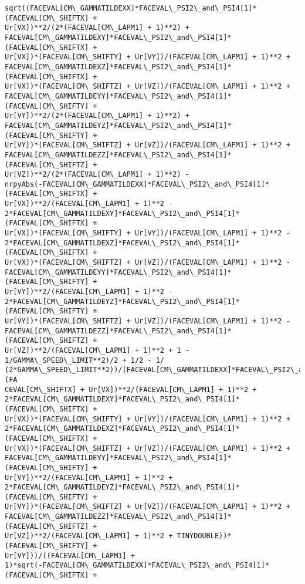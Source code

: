 \documentclass[landscape,letterpaper,10pt,english]{article}
\begin{document}
\begin{Verbatim}[commandchars=\\\{\}]
sqrt((FACEVAL[CM\_GAMMATILDEXX]*FACEVAL\_PSI2\_and\_PSI4[1]*(FACEVAL[CM\_SHIFTX] +
Ur[VX])**2/(2*(FACEVAL[CM\_LAPM1] + 1)**2) +
FACEVAL[CM\_GAMMATILDEXY]*FACEVAL\_PSI2\_and\_PSI4[1]*(FACEVAL[CM\_SHIFTX] +
Ur[VX])*(FACEVAL[CM\_SHIFTY] + Ur[VY])/(FACEVAL[CM\_LAPM1] + 1)**2 +
FACEVAL[CM\_GAMMATILDEXZ]*FACEVAL\_PSI2\_and\_PSI4[1]*(FACEVAL[CM\_SHIFTX] +
Ur[VX])*(FACEVAL[CM\_SHIFTZ] + Ur[VZ])/(FACEVAL[CM\_LAPM1] + 1)**2 +
FACEVAL[CM\_GAMMATILDEYY]*FACEVAL\_PSI2\_and\_PSI4[1]*(FACEVAL[CM\_SHIFTY] +
Ur[VY])**2/(2*(FACEVAL[CM\_LAPM1] + 1)**2) +
FACEVAL[CM\_GAMMATILDEYZ]*FACEVAL\_PSI2\_and\_PSI4[1]*(FACEVAL[CM\_SHIFTY] +
Ur[VY])*(FACEVAL[CM\_SHIFTZ] + Ur[VZ])/(FACEVAL[CM\_LAPM1] + 1)**2 +
FACEVAL[CM\_GAMMATILDEZZ]*FACEVAL\_PSI2\_and\_PSI4[1]*(FACEVAL[CM\_SHIFTZ] +
Ur[VZ])**2/(2*(FACEVAL[CM\_LAPM1] + 1)**2) -
nrpyAbs(-FACEVAL[CM\_GAMMATILDEXX]*FACEVAL\_PSI2\_and\_PSI4[1]*(FACEVAL[CM\_SHIFTX] +
Ur[VX])**2/(FACEVAL[CM\_LAPM1] + 1)**2 -
2*FACEVAL[CM\_GAMMATILDEXY]*FACEVAL\_PSI2\_and\_PSI4[1]*(FACEVAL[CM\_SHIFTX] +
Ur[VX])*(FACEVAL[CM\_SHIFTY] + Ur[VY])/(FACEVAL[CM\_LAPM1] + 1)**2 -
2*FACEVAL[CM\_GAMMATILDEXZ]*FACEVAL\_PSI2\_and\_PSI4[1]*(FACEVAL[CM\_SHIFTX] +
Ur[VX])*(FACEVAL[CM\_SHIFTZ] + Ur[VZ])/(FACEVAL[CM\_LAPM1] + 1)**2 -
FACEVAL[CM\_GAMMATILDEYY]*FACEVAL\_PSI2\_and\_PSI4[1]*(FACEVAL[CM\_SHIFTY] +
Ur[VY])**2/(FACEVAL[CM\_LAPM1] + 1)**2 -
2*FACEVAL[CM\_GAMMATILDEYZ]*FACEVAL\_PSI2\_and\_PSI4[1]*(FACEVAL[CM\_SHIFTY] +
Ur[VY])*(FACEVAL[CM\_SHIFTZ] + Ur[VZ])/(FACEVAL[CM\_LAPM1] + 1)**2 -
FACEVAL[CM\_GAMMATILDEZZ]*FACEVAL\_PSI2\_and\_PSI4[1]*(FACEVAL[CM\_SHIFTZ] +
Ur[VZ])**2/(FACEVAL[CM\_LAPM1] + 1)**2 + 1 - 1/GAMMA\_SPEED\_LIMIT**2)/2 + 1/2 - 1/
(2*GAMMA\_SPEED\_LIMIT**2))/(FACEVAL[CM\_GAMMATILDEXX]*FACEVAL\_PSI2\_and\_PSI4[1]*(FA
CEVAL[CM\_SHIFTX] + Ur[VX])**2/(FACEVAL[CM\_LAPM1] + 1)**2 +
2*FACEVAL[CM\_GAMMATILDEXY]*FACEVAL\_PSI2\_and\_PSI4[1]*(FACEVAL[CM\_SHIFTX] +
Ur[VX])*(FACEVAL[CM\_SHIFTY] + Ur[VY])/(FACEVAL[CM\_LAPM1] + 1)**2 +
2*FACEVAL[CM\_GAMMATILDEXZ]*FACEVAL\_PSI2\_and\_PSI4[1]*(FACEVAL[CM\_SHIFTX] +
Ur[VX])*(FACEVAL[CM\_SHIFTZ] + Ur[VZ])/(FACEVAL[CM\_LAPM1] + 1)**2 +
FACEVAL[CM\_GAMMATILDEYY]*FACEVAL\_PSI2\_and\_PSI4[1]*(FACEVAL[CM\_SHIFTY] +
Ur[VY])**2/(FACEVAL[CM\_LAPM1] + 1)**2 +
2*FACEVAL[CM\_GAMMATILDEYZ]*FACEVAL\_PSI2\_and\_PSI4[1]*(FACEVAL[CM\_SHIFTY] +
Ur[VY])*(FACEVAL[CM\_SHIFTZ] + Ur[VZ])/(FACEVAL[CM\_LAPM1] + 1)**2 +
FACEVAL[CM\_GAMMATILDEZZ]*FACEVAL\_PSI2\_and\_PSI4[1]*(FACEVAL[CM\_SHIFTZ] +
Ur[VZ])**2/(FACEVAL[CM\_LAPM1] + 1)**2 + TINYDOUBLE))*(FACEVAL[CM\_SHIFTY] +
Ur[VY]))/((FACEVAL[CM\_LAPM1] +
1)*sqrt(-FACEVAL[CM\_GAMMATILDEXX]*FACEVAL\_PSI2\_and\_PSI4[1]*(FACEVAL[CM\_SHIFTX] +

\end{Verbatim}
\end{document}

